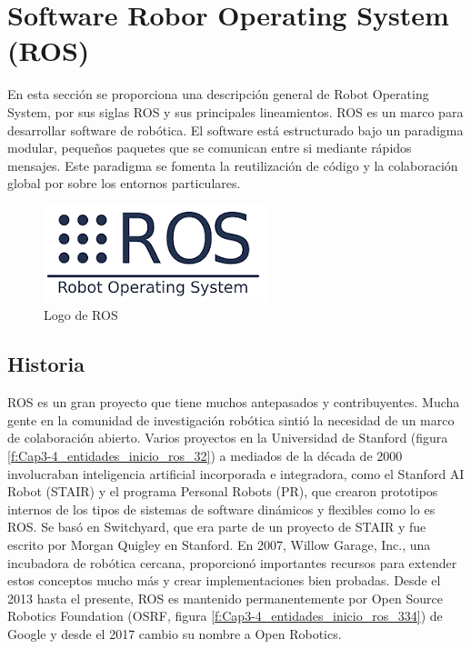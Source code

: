     \newpage

\section{Software Robor Operating System (ROS)}
    
        En esta sección se proporciona una descripción general de Robot Operating System, por sus siglas ROS y sus principales lineamientos. ROS es un marco para desarrollar software de robótica. El software está estructurado bajo un paradigma modular, pequeños paquetes que se comunican entre si mediante rápidos mensajes. Este paradigma se fomenta la reutilización de código y la colaboración global por sobre los entornos particulares.
    
    \begin{figure}[htb]
        \centering
        \includegraphics[width=0.5\linewidth]{Main/Chapter3/Images3/3-4/logo-ros.png}
        \caption{Logo de ROS \cite{ros2222}}
        \label{f:Cap3-4_logo_ros}
    \end{figure}
    
    \subsection{Historia}
    
        ROS es un gran proyecto que tiene muchos antepasados y contribuyentes. Mucha gente en la comunidad de investigación robótica sintió la necesidad de un marco de colaboración abierto. Varios proyectos en la Universidad de Stanford (figura \eqref{f:Cap3-4_entidades_inicio_ros_32}) a mediados de la década de 2000 involucraban inteligencia artificial incorporada e integradora, como el Stanford AI Robot (STAIR) y el programa Personal Robots (PR), que crearon prototipos internos de los tipos de sistemas de software dinámicos y flexibles como lo es ROS. Se basó en Switchyard, que era parte de un proyecto de STAIR y fue escrito por Morgan Quigley en Stanford. En 2007, Willow Garage, Inc., una incubadora de robótica cercana, proporcionó importantes recursos para extender estos conceptos mucho más y crear implementaciones bien probadas. Desde el 2013 hasta el presente, ROS es mantenido permanentemente por Open Source Robotics Foundation (OSRF, figura \eqref{f:Cap3-4_entidades_inicio_ros_334}) de Google y desde el 2017 cambio su nombre a Open Robotics.
        
